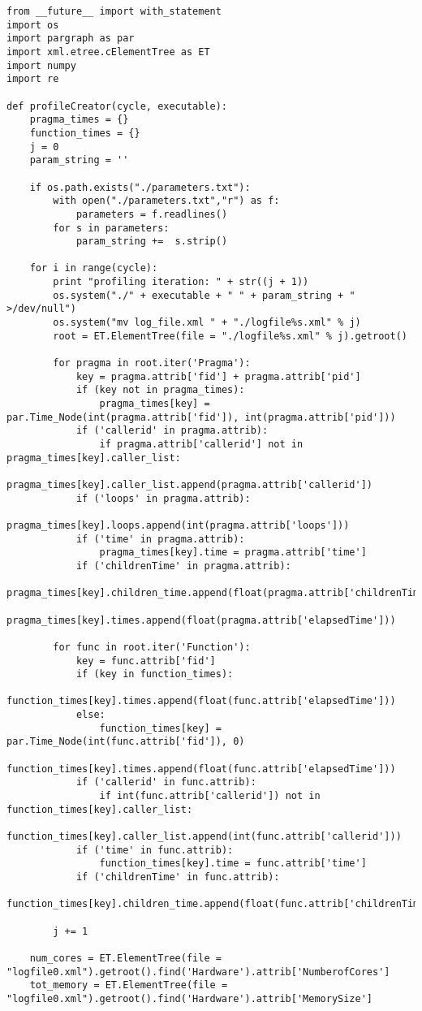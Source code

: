 \documentclass[a4paper,11pt,twoside]{book}
\begin{document}
\begin{lstlisting}[language=CCC, caption=profiler.py]
from __future__ import with_statement
import os
import pargraph as par
import xml.etree.cElementTree as ET
import numpy 
import re

def profileCreator(cycle, executable):
	pragma_times = {}
	function_times = {}
	j = 0
	param_string = ''

	if os.path.exists("./parameters.txt"):
		with open("./parameters.txt","r") as f:
			parameters = f.readlines()
		for s in parameters:
			param_string +=  s.strip()

	for i in range(cycle):
		print "profiling iteration: " + str((j + 1))
		os.system("./" + executable + " " + param_string + " >/dev/null")	
		os.system("mv log_file.xml " + "./logfile%s.xml" % j)
		root = ET.ElementTree(file = "./logfile%s.xml" % j).getroot()

		for pragma in root.iter('Pragma'):
			key = pragma.attrib['fid'] + pragma.attrib['pid']
			if (key not in pragma_times):
				pragma_times[key] = par.Time_Node(int(pragma.attrib['fid']), int(pragma.attrib['pid']))
			if ('callerid' in pragma.attrib):
				if pragma.attrib['callerid'] not in pragma_times[key].caller_list:
					pragma_times[key].caller_list.append(pragma.attrib['callerid'])
			if ('loops' in pragma.attrib):
				pragma_times[key].loops.append(int(pragma.attrib['loops']))
			if ('time' in pragma.attrib):
				pragma_times[key].time = pragma.attrib['time']
			if ('childrenTime' in pragma.attrib):
				pragma_times[key].children_time.append(float(pragma.attrib['childrenTime']))
			pragma_times[key].times.append(float(pragma.attrib['elapsedTime']))

		for func in root.iter('Function'):
			key = func.attrib['fid']
			if (key in function_times):
				function_times[key].times.append(float(func.attrib['elapsedTime']))
			else:
				function_times[key] = par.Time_Node(int(func.attrib['fid']), 0)
				function_times[key].times.append(float(func.attrib['elapsedTime']))
			if ('callerid' in func.attrib):
				if int(func.attrib['callerid']) not in function_times[key].caller_list:
					function_times[key].caller_list.append(int(func.attrib['callerid']))
			if ('time' in func.attrib):
				function_times[key].time = func.attrib['time']
			if ('childrenTime' in func.attrib):
				function_times[key].children_time.append(float(func.attrib['childrenTime']))

		j += 1

	num_cores = ET.ElementTree(file = "logfile0.xml").getroot().find('Hardware').attrib['NumberofCores']
	tot_memory = ET.ElementTree(file = "logfile0.xml").getroot().find('Hardware').attrib['MemorySize']


\end{lstlisting}
\end{document}
